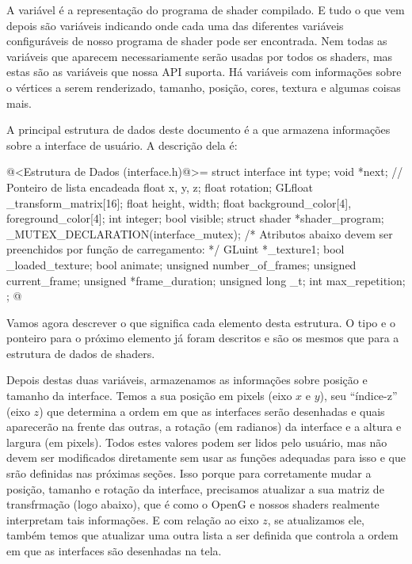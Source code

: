A variável  é a representação do programa de
shader compilado. E tudo o que vem depois são variáveis indicando onde
cada uma das diferentes variáveis configuráveis de nosso programa de
shader pode ser encontrada. Nem todas as variáveis que aparecem
necessariamente serão usadas por todos os shaders, mas estas são as
variáveis que nossa API suporta. Há variáveis com informações sobre o
vértices a serem renderizado, tamanho, posição, cores, textura e
algumas coisas mais.


A principal estrutura de dados deste documento é a que armazena
informações sobre a interface de usuário. A descrição dela é:

\iniciocodigo
@<Estrutura de Dados (interface.h)@>=
struct interface {
  int type;
  void *next; // Ponteiro de lista encadeada
  float x, y, z;
  float rotation;
  GLfloat _transform_matrix[16];
  float height, width;
  float background_color[4], foreground_color[4];
  int integer;
  bool visible;
  struct shader *shader_program;
  _MUTEX_DECLARATION(interface_mutex);
  /* Atributos abaixo devem ser preenchidos por função de carregamento: */
  GLuint *_texture1;
  bool _loaded_texture;
  bool animate;
  unsigned number_of_frames;
  unsigned current_frame;
  unsigned *frame_duration;
  unsigned long _t;
  int max_repetition;
};
@
\fimcodigo

Vamos agora descrever o que significa cada elemento desta estrutura. O
tipo e o ponteiro para o próximo elemento já foram descritos e são os
mesmos que para a estrutura de dados de shaders.

Depois destas duas variáveis, armazenamos as informações sobre posição
e tamanho da interface. Temos a sua posição em pixels (eixo $x$ e
$y$), seu ``índice-z'' (eixo $z$) que determina a ordem em que as
interfaces serão desenhadas e quais aparecerão na frente das outras, a
rotação (em radianos) da interface e a altura e largura (em
pixels). Todos estes valores podem ser lidos pelo usuário, mas não
devem ser modificados diretamente sem usar as funções adequadas para
isso e que srão definidas nas próximas seções. Isso porque para
corretamente mudar a posição, tamanho e rotação da interface,
precisamos atualizar a sua matriz de transfrmação (logo abaixo), que é
como o OpenG e nossos shaders realmente interpretam tais
informações. E com relação ao eixo $z$, se atualizamos ele, também
temos que atualizar uma outra lista a ser definida que controla a
ordem em que as interfaces são desenhadas na tela.

